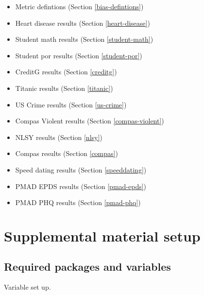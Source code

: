 \documentclass[
]{book}
\providecommand{\tightlist}{%
  \setlength{\itemsep}{0pt}\setlength{\parskip}{0pt}}
\begin{document}
\begin{itemize}
\tightlist
\item
  Metric defintions (Section \ref{bias-defintions})
\item
  Heart disease results (Section \ref{heart-disease})
\item
  Student math results (Section \ref{student-math})
\item
  Student por results (Section \ref{student-por})
\item
  CreditG results (Section \ref{creditg})
\item
  Titanic results (Section \ref{titanic})
\item
  US Crime results (Section \ref{us-crime})
\item
  Compas Violent results (Section \ref{compas-violent})
\item
  NLSY results (Section \ref{nlsy})
\item
  Compas results (Section \ref{compas})
\item
  Speed dating results (Section \ref{speeddating})
\item
  PMAD EPDS results (Section \ref{pmad-epds})
\item
  PMAD PHQ results (Section \ref{pmad-phq})
\end{itemize}

\hypertarget{supplemental-material-setup}{%
\section{Supplemental material setup}\label{supplemental-material-setup}}

\hypertarget{required-packages-and-variables}{%
\subsection{Required packages and variables}\label{required-packages-and-variables}}

Variable set up.
\end{document}
